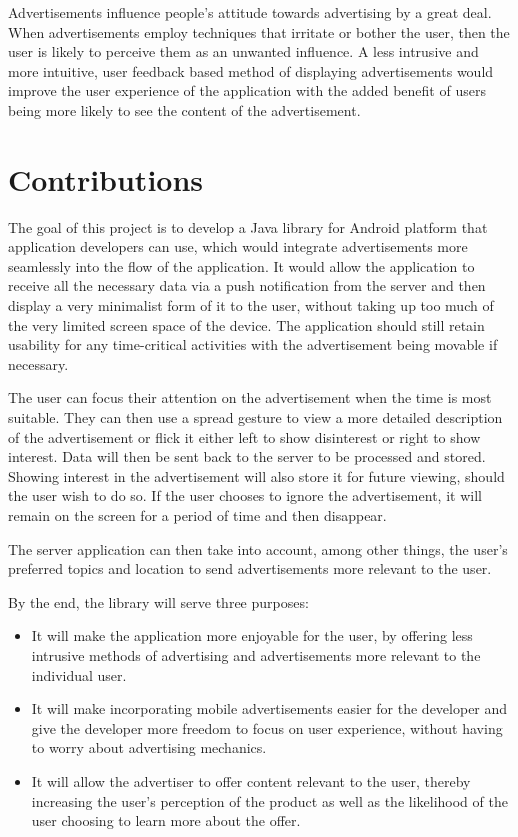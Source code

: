 Advertisements influence people's attitude towards advertising by a great deal. When advertisements employ techniques that irritate or bother the user, then the user is likely to perceive them as an unwanted influence.\cite{chowdhury2010consumer} A less intrusive and more intuitive, user feedback based method of displaying advertisements would improve the user experience of the application with the added benefit of users being more likely to see the content of the advertisement.

\section{Contributions}
The goal of this project is to develop a Java library for Android \cite{android:platform} platform that application developers can use, which would integrate advertisements more seamlessly into the flow of the application. It would allow the application to receive all the necessary data via a push notification from the server and then display a very minimalist form of it to the user, without taking up too much of the very limited screen space of the device. The application should still retain usability for any time-critical activities with the advertisement being movable if necessary.

The user can focus their attention on the advertisement when the time is most suitable. They can then use a spread gesture to view a more detailed description of the advertisement or flick it either left to show disinterest or right to show interest. Data will then be sent back to the server to be processed and stored. Showing interest in the advertisement will also store it for future viewing, should the user wish to do so. If the user chooses to ignore the advertisement, it will remain on the screen for a period of time and then disappear.

The server application can then take into account, among other things, the user's preferred topics and location to send advertisements more relevant to the user.

By the end, the library will serve three purposes:
\begin{itemize}
  \item It will make the application more enjoyable for the user, by offering less intrusive methods of advertising and advertisements more relevant to the individual user.
  \item It will make incorporating mobile advertisements easier for the developer and give the developer more freedom to focus on user experience, without having to worry about advertising mechanics.
  \item It will allow the advertiser to offer content relevant to the user, thereby increasing the user's perception of the product as well as the likelihood of the user choosing to learn more about the offer.
\end{itemize}


